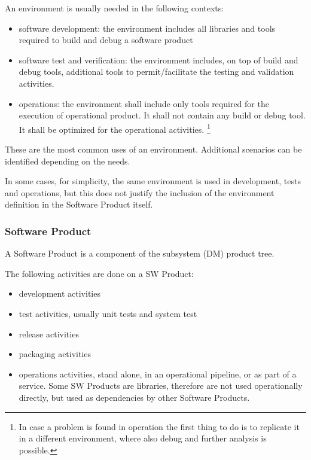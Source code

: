 An environment is usually needed in the following contexts:

\begin{itemize}
\item software development: the environment includes all libraries and tools required to build and debug a software product
\item software test and verification: the environment includes, on top of build and debug tools, additional tools to permit/facilitate the testing and validation activities.
\item operations: the environment shall include only tools required for the execution of operational product. It shall not contain any build or debug tool. It shall be optimized for the operational activities. \footnote{In case a problem is found in operation the first thing to do is to replicate it in a different environment, where also debug and further analysis is possible.}
\end{itemize}

These are the most common uses of an environment. Additional scenarios can be identified depending on the needs.

In some cases, for simplicity, the same environment is used in development, tests and operations, but this does not justify the inclusion of the environment definition in the Software Product itself.


\subsubsection{Software Product} \label{sec:swdef}

A Software Product is a component of the subsystem (DM) product tree.

The following activities are done on a SW Product:
\begin{itemize}
\item development activities
\item test activities, usually unit tests and system test
\item release activities
\item packaging activities
\item operations activities, stand alone, in an operational pipeline, or as part of a service. Some SW Products are libraries, therefore are not used operationally directly, but used as dependencies by other Software Products.
\end{itemize}

